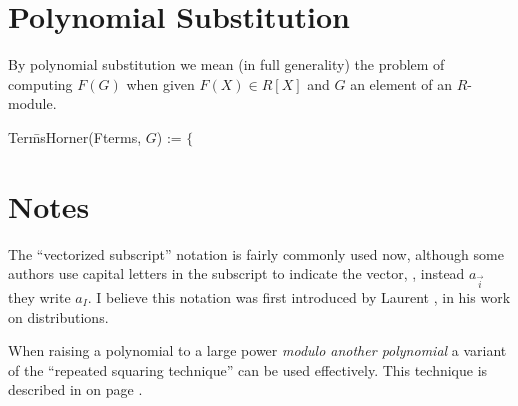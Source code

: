 \section{Polynomial Substitution}
\label{Poly:Subs:Sec}

By polynomial substitution we mean (in full generality) the problem of
computing $F(G)$ when given $F(X) \in R[X]$ and $G$ an element of an
$R$-module.

\begindsacode
Ter\=msHorner(Fterms, $G$) := $\{$ \\
\> 

\enddsacode


\section*{Notes}

\footnotesize

 The ``vectorized subscript''
notation is fairly commonly used now, although some authors use
capital letters in the subscript to indicate the vector, \ie, instead
$a_{\vec i}$ they write $a_I$.  I believe this notation was first
introduced by Laurent {\SchwartzL}, in his work on distributions.

 When raising a polynomial to a large
power {\em modulo another polynomial} a variant of the ``repeated
squaring technique'' can be used effectively.  This technique is
described in  on page
\pageref{FFac:Distinct:Sec}.

\normalsize
